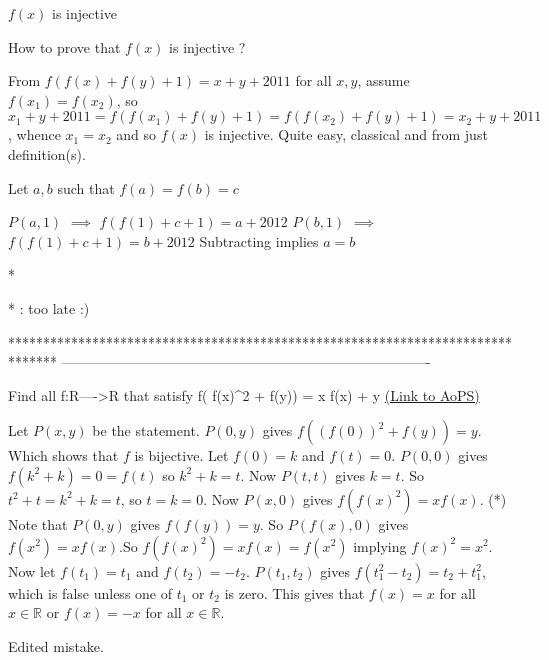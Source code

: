 \begin{solution}
	\begin{tcolorbox}$f(x)$ is injective\end{tcolorbox}

How to prove that $f(x)$ is injective ?
\end{solution}



\begin{solution}
	From $f(f(x)+f(y)+1)=x+y+2011$ for all $x,y$, assume $f(x_1) = f(x_2)$, so $x_1+y+2011 = f(f(x_1)+f(y)+1)=f(f(x_2)+f(y)+1)=x_2+y+2011$, whence $x_1=x_2$ and so $f(x)$ is injective. Quite easy, classical and from just definition(s).
\end{solution}



\begin{solution}
	Let $a,b$ such that $f(a)=f(b)=c$

$P(a,1)$ $\implies$ $f(f(1)+c+1)=a+2012$
$P(b,1)$ $\implies$ $f(f(1)+c+1)=b+2012$
Subtracting implies $a=b$

* * : too late :)
\end{solution}
*******************************************************************************
-------------------------------------------------------------------------------

\begin{problem}
	Find all f:R---->R that satisfy  f( f(x)^2 + f(y)) = x f(x) + y
	\flushright \href{https://artofproblemsolving.com/community/c6h484647}{(Link to AoPS)}
\end{problem}



\begin{solution}
	Let $P(x,y)$ be the statement. $P(0,y)$ gives $f((f(0))^2 + f(y) ) = y$. Which shows that $f$ is bijective. Let $f(0) = k$ and $f(t) = 0$. $P(0,0)$ gives $f(k^2 + k) = 0 = f(t)$ so $k^2 + k = t$. Now $P(t,t)$ gives $k=t$. So $t^2 + t = k^2 + k = t$, so $t=k=0$. Now $P(x,0)$ gives $f(f(x)^2 ) = xf(x)$. (*) Note that $P(0,y)$ gives $f(f(y))= y$. So $P(f(x), 0)$ gives $f(x^2) = xf(x)$.So $f(f(x)^2) = xf(x) = f(x^2)$ implying $f(x)^2 = x^2$. Now let $f(t_1) = t_1$ and $f(t_2) = -t_2$. $P(t_1,t_2)$ gives $f(t_1 ^2 - t_2) = t_2 + t_1 ^2$, which is false unless one of $t_1$ or $t_2$ is zero. This gives that $f(x) = x$  for all $x \in \mathbb{R}$ or $f(x) = - x$ for all $x \in \mathbb{R}$.

Edited mistake.
\end{solution}




